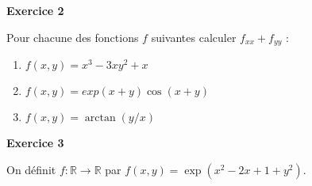 \documentclass[a4paper,12pt]{article}
\begin{document}



\hrulefill

\vspace{1cm}

\begin{center}
{\large{\bf Exercice 2}}
\end{center}

Pour chacune des fonctions $f$ suivantes calculer $f_{xx} + f_{yy}$
: 

\begin{enumerate}
	\item $f(x,y)=  x^3 - 3xy^2 + x$
	\item $f(x,y) = exp(x+y) \cos(x+y)$
	\item $f(x,y)=  \arctan(y/x)$
\end{enumerate}

\hrulefill



\vspace{1cm}

\begin{center}
{\large{\bf Exercice 3}}
\end{center}


On définit $f:\mathbb{R} \rightarrow	\mathbb{R}$ par 
$f(x,y) = \exp(x^2 -2x + 1 + y^2 )$.
\end{document}
